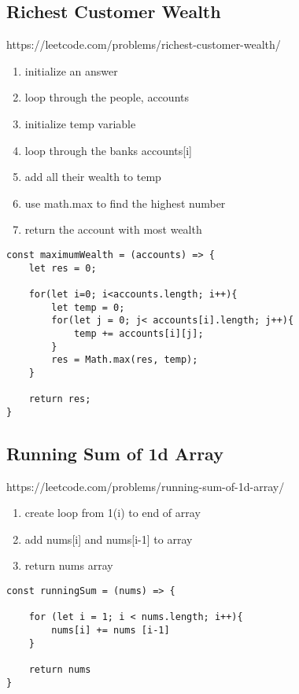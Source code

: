 \documentclass[10pt]{article}
\begin{document}
\medskip %

\pagebreak
\medskip %
\subsection{Richest Customer Wealth}
https://leetcode.com/problems/richest-customer-wealth/

\begin{enumerate}
	\item initialize an answer
	\item loop through the people, accounts
	\item initialize temp variable
	\item loop through the banks accounts[i]
	\item add all their wealth to temp 
	\item use math.max to find the highest number 
	\item return the account with most wealth
\end{enumerate}

\begin{lstlisting}[title=Solution maximumWealth, captionpos=t]
const maximumWealth = (accounts) => {
    let res = 0;

    for(let i=0; i<accounts.length; i++){
        let temp = 0;
        for(let j = 0; j< accounts[i].length; j++){
            temp += accounts[i][j];
        }
        res = Math.max(res, temp);
    }
    
    return res;
}
\end{lstlisting}

\medskip %

\pagebreak
\medskip %
\subsection{Running Sum of 1d Array}
https://leetcode.com/problems/running-sum-of-1d-array/

\begin{enumerate}
	\item create loop from 1(i) to end of array 
	\item add nums[i] and nums[i-1] to array
	\item return nums array
\end{enumerate}

\begin{lstlisting}[title=Solution runningSum, captionpos=t]
const runningSum = (nums) => {
    
    for (let i = 1; i < nums.length; i++){
        nums[i] += nums [i-1]
    }

    return nums
}\end{lstlisting}
\end{document}
